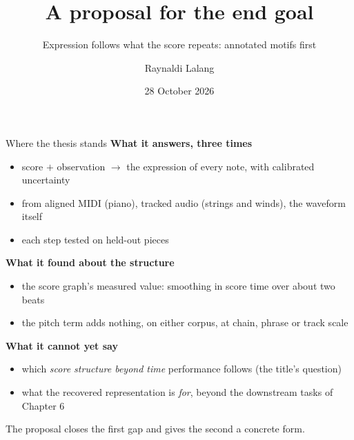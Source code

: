 \documentclass[aspectratio=169,11pt]{beamer}
\title{\textbf{A proposal for the end goal}}
\subtitle{Expression follows what the score repeats: annotated motifs first}
\author{Raynaldi Lalang}
\institute{Kyoto University}
\date{28 October 2026}
\begin{document}
\begin{frame}
  \titlepage
\end{frame}

\begin{frame}{Where the thesis stands}
  \textbf{What it answers, three times}
  \begin{itemize}
    \item score $+$ observation $\to$ the expression of every note, with calibrated uncertainty
    \item from aligned MIDI (piano), tracked audio (strings and winds), the waveform itself
    \item each step tested on held-out pieces
  \end{itemize}
  \vspace{1mm}
  \textbf{What it found about the structure}
  \begin{itemize}
    \item the score graph's measured value: smoothing in score time over about two beats
    \item the pitch term adds nothing, on either corpus, at chain, phrase or track scale
  \end{itemize}
  \vspace{1mm}
  \textbf{What it cannot yet say}
  \begin{itemize}
    \item which \emph{score structure beyond time} performance follows (the title's question)
    \item what the recovered representation is \emph{for}, beyond the downstream tasks of Chapter 6
  \end{itemize}
  \vspace{1mm}
  The proposal closes the first gap and gives the second a concrete form.
\end{frame}
\end{document}
